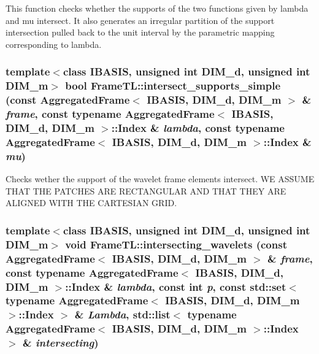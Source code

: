 This function checks whether the supports of the two functions given by lambda and mu intersect. It also generates an irregular partition of the support intersection pulled back to the unit interval by the parametric mapping corresponding to lambda. \hypertarget{namespaceFrameTL_8008f4b3d0a7bb7acab2b74a29d60222}{
\subsubsection[intersect\_\-supports\_\-simple]{\setlength{\rightskip}{0pt plus 5cm}template$<$class IBASIS, unsigned int DIM\_\-d, unsigned int DIM\_\-m$>$ bool FrameTL::intersect\_\-supports\_\-simple (const AggregatedFrame$<$ IBASIS, DIM\_\-d, DIM\_\-m $>$ \& {\em frame}, \/  const typename AggregatedFrame$<$ IBASIS, DIM\_\-d, DIM\_\-m $>$::Index \& {\em lambda}, \/  const typename AggregatedFrame$<$ IBASIS, DIM\_\-d, DIM\_\-m $>$::Index \& {\em mu})}}
\label{namespaceFrameTL_8008f4b3d0a7bb7acab2b74a29d60222}


Checks wether the support of the wavelet frame elements intersect. WE ASSUME THAT THE PATCHES ARE RECTANGULAR AND THAT THEY ARE ALIGNED WITH THE CARTESIAN GRID. \hypertarget{namespaceFrameTL_0005c53dfff8661290582ea77b5ebcff}{
\subsubsection[intersecting\_\-wavelets]{\setlength{\rightskip}{0pt plus 5cm}template$<$class IBASIS, unsigned int DIM\_\-d, unsigned int DIM\_\-m$>$ void FrameTL::intersecting\_\-wavelets (const AggregatedFrame$<$ IBASIS, DIM\_\-d, DIM\_\-m $>$ \& {\em frame}, \/  const typename AggregatedFrame$<$ IBASIS, DIM\_\-d, DIM\_\-m $>$::Index \& {\em lambda}, \/  const int {\em p}, \/  const std::set$<$ typename AggregatedFrame$<$ IBASIS, DIM\_\-d, DIM\_\-m $>$::Index $>$ \& {\em Lambda}, \/  std::list$<$ typename AggregatedFrame$<$ IBASIS, DIM\_\-d, DIM\_\-m $>$::Index $>$ \& {\em intersecting})}}
\label{namespaceFrameTL_0005c53dfff8661290582ea77b5ebcff}



